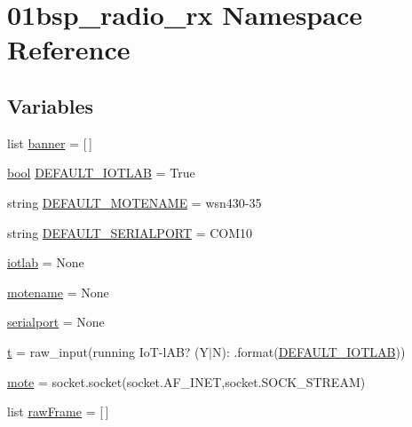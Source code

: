 \hypertarget{namespace01bsp__radio__rx}{}\section{01bsp\+\_\+radio\+\_\+rx Namespace Reference}
\label{namespace01bsp__radio__rx}
\subsection*{Variables}
\begin{DoxyCompactItemize}
\item 
list \hyperlink{namespace01bsp__radio__rx_ac941cf5e2831ceb1c533dd8058d39380}{banner} = \mbox{[}$\,$\mbox{]}
\item 
\hyperlink{_p_e___types_8h_a97a80ca1602ebf2303258971a2c938e2}{bool} \hyperlink{namespace01bsp__radio__rx_a70be0965c27e9db09d803e6e531cffd1}{D\+E\+F\+A\+U\+L\+T\+\_\+\+I\+O\+T\+L\+AB} = True
\item 
string \hyperlink{namespace01bsp__radio__rx_a6d4b4d7b47e25eda283a4b4d9169fc53}{D\+E\+F\+A\+U\+L\+T\+\_\+\+M\+O\+T\+E\+N\+A\+ME} = \textquotesingle{}wsn430-\/35\textquotesingle{}
\item 
string \hyperlink{namespace01bsp__radio__rx_a0c665114ad67636ce2be1104ebcb3e25}{D\+E\+F\+A\+U\+L\+T\+\_\+\+S\+E\+R\+I\+A\+L\+P\+O\+RT} = \textquotesingle{}C\+O\+M10\textquotesingle{}
\item 
\hyperlink{namespace01bsp__radio__rx_a26133b524c864be17671325078cba5fb}{iotlab} = None
\item 
\hyperlink{namespace01bsp__radio__rx_ae193588ed0cf6e039f855f040b00b2e1}{motename} = None
\item 
\hyperlink{namespace01bsp__radio__rx_a2e2330ae6124312eb30b14b10d881298}{serialport} = None
\item 
\hyperlink{namespace01bsp__radio__rx_a1e8eff7facf7d42348b520b3ff8525f3}{t} = raw\+\_\+input(\textquotesingle{}running IoT-\/l\+AB? (Y$\vert$N)\+: \textquotesingle{}.format(\hyperlink{namespace01bsp__radio__rx_a70be0965c27e9db09d803e6e531cffd1}{D\+E\+F\+A\+U\+L\+T\+\_\+\+I\+O\+T\+L\+AB}))
\item 
\hyperlink{namespace01bsp__radio__rx_a0748304cc94c73d2ff24e024c7c25548}{mote} = socket.\+socket(socket.\+A\+F\+\_\+\+I\+N\+ET,socket.\+S\+O\+C\+K\+\_\+\+S\+T\+R\+E\+AM)
\item 
list \hyperlink{namespace01bsp__radio__rx_a4fb6aafdc59522c766004b87f11e7aa1}{raw\+Frame} = \mbox{[}$\,$\mbox{]}
\item 

\end{DoxyCompactItemize}
